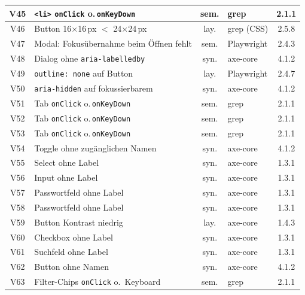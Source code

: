 \begin{longtable}{|c|p{5.8cm}|c|p{3.6cm}|c|}
V45  & \texttt{<li>} \texttt{onClick} o.\,\texttt{onKeyDown} & sem. & grep    & 2.1.1 \\ \hline
V46  & Button 16$\times$16\,px $<$ 24$\times$24\,px & lay. & grep (\ac{CSS})     & 2.5.8 \\ \hline
V47  & Modal: Fokusübernahme beim Öffnen fehlt                     & sem. & Playwright              & 2.4.3 \\ \hline
V48  & Dialog ohne \texttt{aria-labelledby}      & syn. & axe-core                & 4.1.2 \\ \hline
V49  & \texttt{outline: none} auf Button         & lay. & Playwright              & 2.4.7 \\ \hline
V50  & \texttt{aria-hidden} auf fokussierbarem   & syn. & axe-core                & 4.1.2 \\ \hline
V51  & Tab \texttt{onClick} o.\,\texttt{onKeyDown} & sem. & grep               & 2.1.1 \\ \hline
V52  & Tab \texttt{onClick} o.\,\texttt{onKeyDown} & sem. & grep               & 2.1.1 \\ \hline
V53  & Tab \texttt{onClick} o.\,\texttt{onKeyDown} & sem. & grep               & 2.1.1 \\ \hline
V54  & Toggle ohne zugänglichen Namen            & syn. & axe-core                & 4.1.2 \\ \hline
V55  & Select ohne Label                         & syn. & axe-core                & 1.3.1 \\ \hline
V56  & Input ohne Label                          & syn. & axe-core                & 1.3.1 \\ \hline
V57  & Passwortfeld ohne Label                   & syn. & axe-core                & 1.3.1 \\ \hline
V58  & Passwortfeld ohne Label                   & syn. & axe-core                & 1.3.1 \\ \hline
V59  & Button Kontrast niedrig                   & lay. & axe-core                & 1.4.3 \\ \hline
V60  & Checkbox ohne Label                       & syn. & axe-core                & 1.3.1 \\ \hline
V61  & Suchfeld ohne Label                       & syn. & axe-core                & 1.3.1 \\ \hline
V62  & Button ohne Namen                         & syn. & axe-core                & 4.1.2 \\ \hline
V63  & Filter-Chips \texttt{onClick} o.\ Keyboard & sem. & grep                 & 2.1.1 \\ \hline

\end{longtable}
